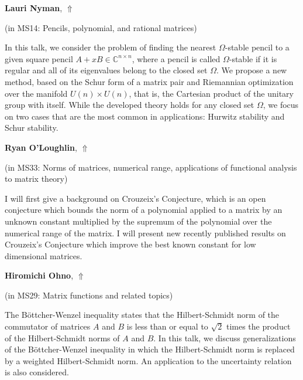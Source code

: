 \documentclass[ILAS2025-program.tex]{subfiles}
\begin{document}
\hypertarget{down0327}{}\begin{ilasabstract}
    
\textbf{Lauri Nyman},  \hfill \hyperlink{up0327}{$\Uparrow$}
    
    
(in {\color{mstitle}MS14: Pencils, polynomial, and rational matrices})
        
\mtskip
    In this talk, we consider the problem of finding the nearest $\Omega$-stable pencil to a given square pencil $A+xB \in \mathbb{C}^{n \times n}$, where a pencil is called $\Omega$-stable if it is regular and all of its eigenvalues belong to the closed set $\Omega$. We propose a new method, based on the Schur form of a matrix pair and Riemannian optimization over the manifold $U(n) \times U(n)$, that is, the Cartesian product of the unitary group with itself. While the developed theory holds for any closed set $\Omega$, we focus on two cases that are the most common in applications: Hurwitz stability and Schur stability. 

\end{ilasabstract}
    

\hypertarget{down0277}{}\begin{ilasabstract}
    
\textbf{Ryan O'Loughlin},  \hfill \hyperlink{up0277}{$\Uparrow$}
    
    
(in {\color{mstitle}MS33: Norms of matrices, numerical range, applications of functional analysis to matrix theory})
        
\mtskip
    I will first give a background on Crouzeix's Conjecture, which is an open conjecture which bounds the norm of a polynomial applied to a matrix by an unknown constant multiplied by the supremum of the polynomial over the numerical range of the matrix. I will present new recently published results on Crouzeix's Conjecture which improve the best known constant for low dimensional matrices.

\end{ilasabstract}
    

\hypertarget{down0014}{}\begin{ilasabstract}
    
\textbf{Hiromichi Ohno},  \hfill \hyperlink{up0014}{$\Uparrow$}
    
    
(in {\color{mstitle}MS29: Matrix functions and related topics})
        
\mtskip
    The B\"ottcher-Wenzel inequality states that the Hilbert-Schmidt norm of the commutator of matrices $A$ and $B$ is less than or equal to $\sqrt{2}$ times the product of the Hilbert-Schmidt norms of $A$ and $B$. In this talk, we discuss generalizations of the B\"ottcher-Wenzel inequality in which the Hilbert-Schmidt norm is replaced by a weighted Hilbert-Schmidt norm. An application to the uncertainty relation is also considered.
\end{ilasabstract}
    
\end{document}

